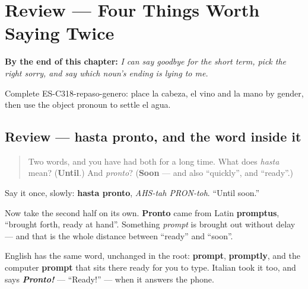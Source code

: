 
\chapter{Review --- Four Things Worth Saying Twice}
\label{ch:repaso-pre-a1}

\begin{chapteropening}
\textbf{By the end of this chapter:} \emph{I can say goodbye for the short term, pick the right sorry, and say which noun's ending is lying to me.}

Complete ES-C318-repaso-genero: place la cabeza, el vino and la mano by gender, then use the object pronoun to settle el agua.
\end{chapteropening}

\section[(review)]{Review — hasta pronto, and the word inside it}

\label{lesson:ES-C318-repaso-despedirse}



\begin{quote}
Two words, and you have had both for a long time. What does \emph{hasta} mean? (\textbf{Until}.) And \emph{pronto}? (\textbf{Soon} — and also \textquotedblleft{}quickly\textquotedblright{}, and \textquotedblleft{}ready\textquotedblright{}.)
\end{quote}

\begin{grammarlens}[title={What you've built}]
Say it once, slowly: \textbf{hasta pronto}, \emph{AHS-tah PRON-toh}. \textquotedblleft{}Until soon.\textquotedblright{}

Now take the second half on its own. \textbf{Pronto} came from Latin \textbf{promptus}, \textquotedblleft{}brought forth, ready at hand\textquotedblright{}. Something \emph{prompt} is brought out without delay — and that is the whole distance between \textquotedblleft{}ready\textquotedblright{} and \textquotedblleft{}soon\textquotedblright{}.

English has the same word, unchanged in the root: \textbf{prompt}, \textbf{promptly}, and the computer \textbf{prompt} that sits there ready for you to type. Italian took it too, and says \emph{\textbf{Pronto!}} — \textquotedblleft{}Ready!\textquotedblright{} — when it answers the phone.
\end{grammarlens}

